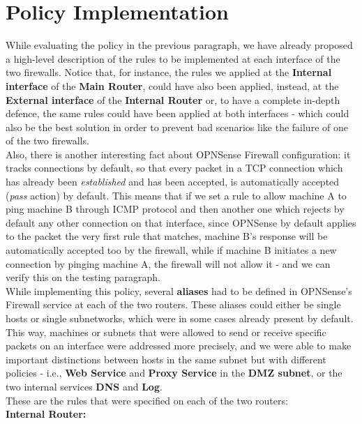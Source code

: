 \section{Policy Implementation}
While evaluating the policy in the previous paragraph, we have already proposed a high-level description of the rules to be implemented at each interface of the two firewalls. Notice that, for instance, the rules we applied at the \textbf{Internal interface} of the \textbf{Main Router}, could have also been applied, instead, at the \textbf{External interface} of the \textbf{Internal Router} or, to have a complete in-depth defence, the same rules could have been applied at both interfaces - which could also be the best solution in order to prevent bad scenarios like the failure of one of the two firewalls.\\
Also, there is another interesting fact about OPNSense Firewall configuration: it tracks connections by default, so that every packet in a TCP connection which has already been \textit{established} and has been accepted, is automatically accepted (\textit{pass} action) by default. This means that if we set a rule to allow machine A to ping machine B through ICMP protocol and then another one which rejects by default any other connection on that interface, since OPNSense by default applies to the packet the very first rule that matches, machine B's response will be automatically accepted too by the firewall, while if machine B initiates a new connection by pinging machine A, the firewall will not allow it - and we can verify this on the testing paragraph.\\
While implementing this policy, several \textbf{aliases} had to be defined in OPNSense's Firewall service at each of the two routers. These aliases could either be single hosts or single subnetworks, which were in some cases already present by default. This way, machines or subnets that were allowed to send or receive specific packets on an interface were addressed more precisely, and we were able to make important distinctions between hosts in the same subnet but with different policies - i.e., \textbf{Web Service} and \textbf{Proxy Service} in the \textbf{DMZ subnet}, or the two internal services \textbf{DNS} and \textbf{Log}.\\
These are the rules that were specified on each of the two routers:\\
\textbf{Internal Router:}

